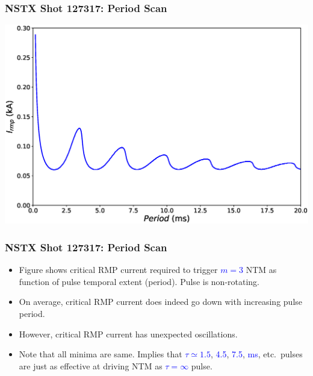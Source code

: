 \documentclass{beamer}
\newcommand{\blue}[1]{\textcolor{blue}{#1}}
\begin{document}
\begin{frame}
\frametitle{NSTX Shot 127317: Period Scan}
\begin{center}
\includegraphics[width=\textwidth]{PeriodScan0.eps}
\end{center}

\end{frame}

\begin{frame}
\frametitle{NSTX Shot 127317: Period Scan}
\begin{itemize}
\item Figure shows critical RMP current required to trigger \blue{$m=3$} NTM as function of pulse temporal extent (period).
Pulse is non-rotating. 

\item On average, critical RMP current does indeed go down with increasing pulse period.
\item However, critical RMP current has unexpected oscillations. 
\item Note that all minima are same. Implies that \blue{$\tau\simeq 1.5$}, \blue{4.5}, \blue{7.5}, \blue{ms}, etc.\ pulses are just as effective
at driving NTM as \blue{$\tau=\infty$} pulse. 
\end{itemize}
\end{frame}
\end{document}

